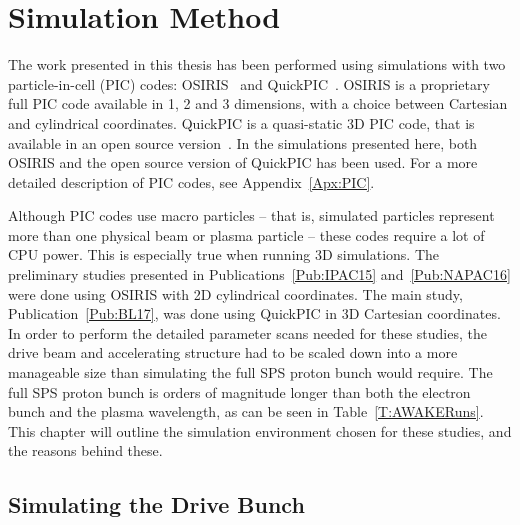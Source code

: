 %
%

\chapter{Simulation Method}
\label{Ch:SimS}

The work presented in this thesis has been performed using simulations with two particle-in-cell (PIC) codes:
OSIRIS~\cite{fonseca:2002} and QuickPIC~\cite{an:2013, huang:2006}.
OSIRIS is a proprietary full PIC code available in 1, 2 and 3 dimensions, with a choice between Cartesian and cylindrical coordinates.
QuickPIC is a quasi-static 3D PIC code, that is available in an open source version~\cite{add:quickpic:web}.
In the simulations presented here, both OSIRIS and the open source version of QuickPIC has been used.
For a more detailed description of PIC codes, see Appendix~\ref{Apx:PIC}.

Although PIC codes use macro particles -- that is, simulated particles represent more than one physical beam or plasma particle -- these codes require a lot of CPU power.
This is especially true when running 3D simulations.
The preliminary studies presented in Publications~\ref{Pub:IPAC15} and~\ref{Pub:NAPAC16} were done using OSIRIS with 2D cylindrical coordinates.
The main study, Publication~\ref{Pub:BL17}, was done using QuickPIC in 3D Cartesian coordinates.
In order to perform the detailed parameter scans needed for these studies, the drive beam and accelerating structure had to be scaled down into a more manageable size than simulating the full SPS proton bunch would require.
The full SPS proton bunch is orders of magnitude longer than both the electron bunch and the plasma wavelength, as can be seen in Table~\ref{T:AWAKERuns}.
This chapter will outline the simulation environment chosen for these studies, and the reasons behind these.

\section{Simulating the Drive Bunch}
\label{Sim:PBeam}


